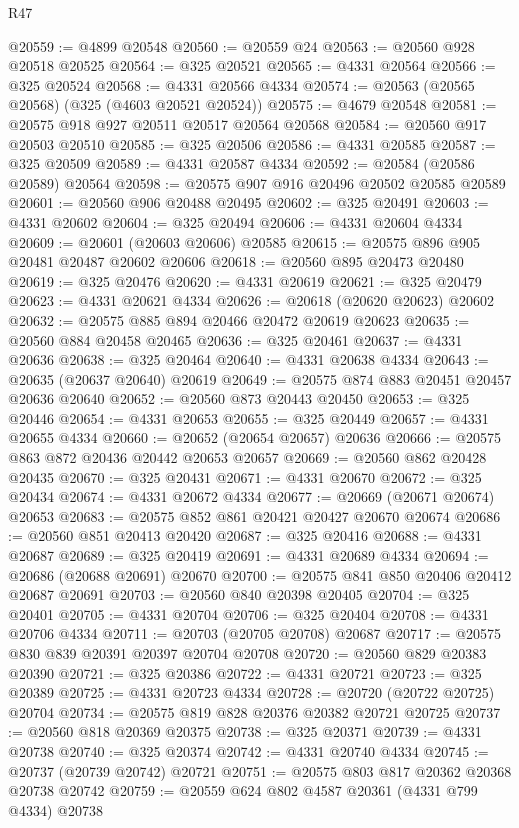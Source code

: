 \begin{lexlean}{R47}
\begin{coremodule}
@20559 := @4899 @20548
@20560 := @20559 @24
@20563 := @20560 @928 @20518 @20525
@20564 := @325 @20521
@20565 := @4331 @20564
@20566 := @325 @20524
@20568 := @4331 @20566 @4334
@20574 := @20563 (@20565 @20568) (@325 (@4603 @20521 @20524))
@20575 := @4679 @20548
@20581 := @20575 @918 @927 @20511 @20517 @20564 @20568
@20584 := @20560 @917 @20503 @20510
@20585 := @325 @20506
@20586 := @4331 @20585
@20587 := @325 @20509
@20589 := @4331 @20587 @4334
@20592 := @20584 (@20586 @20589) @20564
@20598 := @20575 @907 @916 @20496 @20502 @20585 @20589
@20601 := @20560 @906 @20488 @20495
@20602 := @325 @20491
@20603 := @4331 @20602
@20604 := @325 @20494
@20606 := @4331 @20604 @4334
@20609 := @20601 (@20603 @20606) @20585
@20615 := @20575 @896 @905 @20481 @20487 @20602 @20606
@20618 := @20560 @895 @20473 @20480
@20619 := @325 @20476
@20620 := @4331 @20619
@20621 := @325 @20479
@20623 := @4331 @20621 @4334
@20626 := @20618 (@20620 @20623) @20602
@20632 := @20575 @885 @894 @20466 @20472 @20619 @20623
@20635 := @20560 @884 @20458 @20465
@20636 := @325 @20461
@20637 := @4331 @20636
@20638 := @325 @20464
@20640 := @4331 @20638 @4334
@20643 := @20635 (@20637 @20640) @20619
@20649 := @20575 @874 @883 @20451 @20457 @20636 @20640
@20652 := @20560 @873 @20443 @20450
@20653 := @325 @20446
@20654 := @4331 @20653
@20655 := @325 @20449
@20657 := @4331 @20655 @4334
@20660 := @20652 (@20654 @20657) @20636
@20666 := @20575 @863 @872 @20436 @20442 @20653 @20657
@20669 := @20560 @862 @20428 @20435
@20670 := @325 @20431
@20671 := @4331 @20670
@20672 := @325 @20434
@20674 := @4331 @20672 @4334
@20677 := @20669 (@20671 @20674) @20653
@20683 := @20575 @852 @861 @20421 @20427 @20670 @20674
@20686 := @20560 @851 @20413 @20420
@20687 := @325 @20416
@20688 := @4331 @20687
@20689 := @325 @20419
@20691 := @4331 @20689 @4334
@20694 := @20686 (@20688 @20691) @20670
@20700 := @20575 @841 @850 @20406 @20412 @20687 @20691
@20703 := @20560 @840 @20398 @20405
@20704 := @325 @20401
@20705 := @4331 @20704
@20706 := @325 @20404
@20708 := @4331 @20706 @4334
@20711 := @20703 (@20705 @20708) @20687
@20717 := @20575 @830 @839 @20391 @20397 @20704 @20708
@20720 := @20560 @829 @20383 @20390
@20721 := @325 @20386
@20722 := @4331 @20721
@20723 := @325 @20389
@20725 := @4331 @20723 @4334
@20728 := @20720 (@20722 @20725) @20704
@20734 := @20575 @819 @828 @20376 @20382 @20721 @20725
@20737 := @20560 @818 @20369 @20375
@20738 := @325 @20371
@20739 := @4331 @20738
@20740 := @325 @20374
@20742 := @4331 @20740 @4334
@20745 := @20737 (@20739 @20742) @20721
@20751 := @20575 @803 @817 @20362 @20368 @20738 @20742
@20759 := @20559 @624 @802 @4587 @20361 (@4331 @799 @4334) @20738

\end{coremodule}
\end{lexlean}
